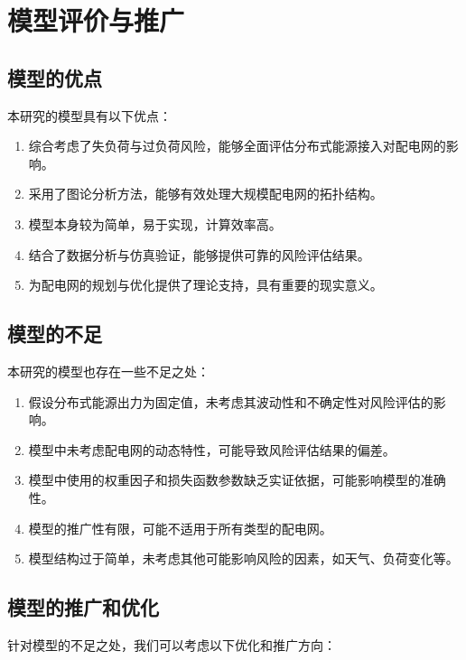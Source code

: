 \documentclass{article}
\begin{document}
\section{模型评价与推广}\label{sec:evaluation}

\subsection{模型的优点}\label{subsec:advantages}

本研究的模型具有以下优点：

\begin{enumerate}
  \item 综合考虑了失负荷与过负荷风险，能够全面评估分布式能源接入对配电网的影响。
  \item 采用了图论分析方法，能够有效处理大规模配电网的拓扑结构。
  \item 模型本身较为简单，易于实现，计算效率高。
  \item 结合了数据分析与仿真验证，能够提供可靠的风险评估结果。
  \item 为配电网的规划与优化提供了理论支持，具有重要的现实意义。
\end{enumerate}

\subsection{模型的不足}\label{subsec:disadvantages}

本研究的模型也存在一些不足之处：

\begin{enumerate}
  \item 假设分布式能源出力为固定值，未考虑其波动性和不确定性对风险评估的影响。
  \item 模型中未考虑配电网的动态特性，可能导致风险评估结果的偏差。
  \item 模型中使用的权重因子和损失函数参数缺乏实证依据，可能影响模型的准确性。
  \item 模型的推广性有限，可能不适用于所有类型的配电网。
  \item 模型结构过于简单，未考虑其他可能影响风险的因素，如天气、负荷变化等。
\end{enumerate}

\subsection{模型的推广和优化}\label{subsec:promotion_optimization}

针对模型的不足之处，我们可以考虑以下优化和推广方向：
\end{document}
